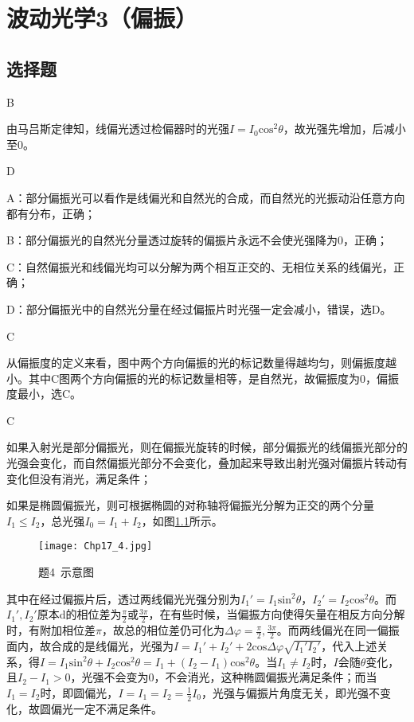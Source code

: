 \chapter{波动光学3（偏振）}
\section{选择题}
\exercise B

\solve 由马吕斯定律知，线偏光透过检偏器时的光强$I=I_0\mathrm{cos}^2\theta$，故光强先增加，后减小至0。

\exercise D

\solve A：部分偏振光可以看作是线偏光和自然光的合成，而自然光的光振动沿任意方向都有分布，正确；

B：部分偏振光的自然光分量透过旋转的偏振片永远不会使光强降为0，正确；

C：自然偏振光和线偏光均可以分解为两个相互正交的、无相位关系的线偏光，正确；

D：部分偏振光中的自然光分量在经过偏振片时光强一定会减小，错误，选D。

\exercise C

\solve 从偏振度的定义来看，图中两个方向偏振的光的标记数量得越均匀，则偏振度越小。其中C图两个方向偏振的光的标记数量相等，是自然光，故偏振度为0，偏振度最小，选C。

\exercise C

\solve 如果入射光是部分偏振光，则在偏振光旋转的时候，部分偏振光的线偏振光部分的光强会变化，而自然偏振光部分不会变化，叠加起来导致出射光强对偏振片转动有变化但没有消光，满足条件；

如果是椭圆偏振光，则可根据椭圆的对称轴将偏振光分解为正交的两个分量$I_1\leqslant I_2$，总光强$I_0=I_1+I_2$，如图\ref{4}所示。

\begin{figure}[htbp]
	\centering
	\texttt{[image: Chp17\_4.jpg]}
	\caption{题4\ 示意图}
	\label{4}
\end{figure}

其中在经过偏振片后，透过两线偏光光强分别为$I_1'=I_1\mathrm{sin}^2\theta$，$I_2'=I_2\mathrm{cos}^2\theta$。而$I_1',I_2'$原本d的相位差为$\frac{\pi}{2}$或$\frac{3\pi}{2}$，在有些时候，当偏振方向使得矢量在相反方向分解时，有附加相位差$\pi$，故总的相位差仍可化为$\Delta \varphi=\frac{\pi}{2},\frac{3\pi}{2}$。而两线偏光在同一偏振面内，故合成的是线偏光，光强为$I=I_1'+I_2'+2\mathrm{cos}\Delta \varphi\sqrt{I_1'I_2'}$，代入上述关系，得$I=I_1\mathrm{sin}^2\theta+I_2\mathrm{cos}^2\theta=I_1+(I_2-I_1)\mathrm{cos}^2\theta$。当$I_1\not= I_2$时，$I$会随$\theta$变化，且$I_2-I_1>0$，光强不会变为0，不会消光，这种椭圆偏振光满足条件；而当$I_1=I_2$时，即圆偏光，$I=I_1=I_2=\frac{1}{2}I_0$，光强与偏振片角度无关，即光强不变化，故圆偏光一定不满足条件。

